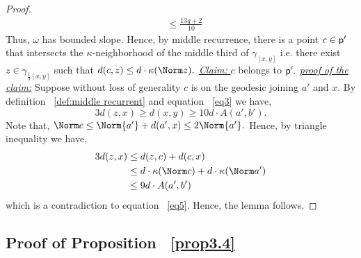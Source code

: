 \documentclass[12 pt]{amsart}
\theoremstyle{definition}
\theoremstyle{remark}
\newcommand{\pp}{{\sf p}}
\begin{document}
\begin{proof}
\begin{align*}
&\leq \frac{13q+2}{10}
\end{align*}
Thus, $\omega$ has bounded slope. Hence, by middle recurrence, there is a point $c \in \pp'$ that intersects the $\kappa$-neighborhood of the middle third of $\gamma_{[x, y]}$ i.e. there exist $z \in \gamma_{\frac{1}{3}[x, y]}$ such that $d(c,z) \leq d \cdot \kappa(\Norm z).$
\newline \underline{\emph{Claim:} } $c$ belongs to $\pp'.$
\newline \underline{\emph{proof of the claim:}} Suppose without loss of generality $c$ is on the geodesic joining $a'$ and $x$. By definition ~\ref{def:middle recurrent} and equation ~\ref{eq3} we have, 
\begin{equation}
    3d(z,x) \geq  d(x,y) \geq 10d \cdot A(a',b'). \label{eq5}
\end{equation}
Note that, $\Norm c \leq \Norm {a'}+ d(a',x) \leq 2 \Norm {a'}.$ Hence, by triangle inequality we have, 
\begin{align*}
  3d(z,x) &\leq d(z,c)+d(c,x)\\
  & \leq d \cdot \kappa(\Norm c)+d \cdot \kappa(\Norm a')\\
  & \leq 9d\cdot A(a',b')
\end{align*}
which is a contradiction to equation ~\ref{eq5}. Hence, the lemma follows.


\end{proof}
\subsection*{Proof of Proposition ~\ref{prop3.4}}
\end{document}
